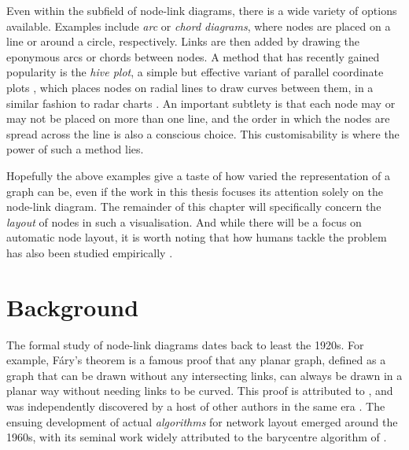 
Even within the subfield of node-link diagrams, there is a wide variety of options available.
Examples include \emph{arc} or \emph{chord diagrams}, where nodes are placed on a line or around a circle, respectively. Links are then added by drawing the eponymous arcs or chords between nodes.
A method that has recently gained popularity is the \emph{hive plot}, a simple but effective variant of parallel coordinate plots \citep{Krzywinski2012}, which places nodes on radial lines to draw curves between them, in a similar fashion to radar charts \citep{Porter2018}. An important subtlety is that each node may or may not be placed on more than one line, and the order in which the nodes are spread across the line is also a conscious choice. This customisability is where the power of such a method lies.

Hopefully the above examples give a taste of how varied the representation of a graph can be, even if the work in this thesis focuses its attention solely on the node-link diagram. The remainder of this chapter will specifically concern the \emph{layout} of nodes in such a visualisation.
And while there will be a focus on automatic node layout, it is worth noting that how humans tackle the problem has also been studied empirically \cite{Purchase2010, Purchase2014}.

\section{Background}
\label{sec:nodes_background}
The formal study of node-link diagrams dates back to least the 1920s. For example, F\'ary's theorem is a famous proof that any planar graph, defined as a graph that can be drawn without any intersecting links, can always be drawn in a planar way without needing links to be curved. This proof is attributed to \citet{Fary1948}, and was independently discovered by a host of other authors in the same era \citep{Steinitz1922, Wagner1936, Koebe1936, Stein1951}.
The ensuing development of actual \emph{algorithms} for network layout emerged around the 1960s, with its seminal work widely attributed to the barycentre algorithm of \citet{Tutte1963}.

